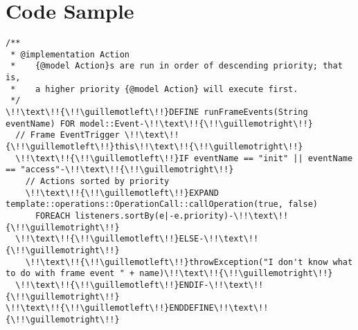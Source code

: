 \chapter{Code Sample}

\begin{verbatim}
/**
 * @implementation Action
 *    {@model Action}s are run in order of descending priority; that is,
 *    a higher priority {@model Action} will execute first.
 */
\!!\text\!!{\!!\guillemotleft\!!}DEFINE runFrameEvents(String eventName) FOR model::Event-\!!\text\!!{\!!\guillemotright\!!}
  // Frame EventTrigger \!!\text\!!{\!!\guillemotleft\!!}this\!!\text\!!{\!!\guillemotright\!!}
  \!!\text\!!{\!!\guillemotleft\!!}IF eventName == "init" || eventName == "access"-\!!\text\!!{\!!\guillemotright\!!}
    // Actions sorted by priority
    \!!\text\!!{\!!\guillemotleft\!!}EXPAND template::operations::OperationCall::callOperation(true, false)
      FOREACH listeners.sortBy(e|-e.priority)-\!!\text\!!{\!!\guillemotright\!!}    
  \!!\text\!!{\!!\guillemotleft\!!}ELSE-\!!\text\!!{\!!\guillemotright\!!}
    \!!\text\!!{\!!\guillemotleft\!!}throwException("I don't know what to do with frame event " + name)\!!\text\!!{\!!\guillemotright\!!}
  \!!\text\!!{\!!\guillemotleft\!!}ENDIF-\!!\text\!!{\!!\guillemotright\!!}
\!!\text\!!{\!!\guillemotleft\!!}ENDDEFINE\!!\text\!!{\!!\guillemotright\!!}
\end{verbatim}
